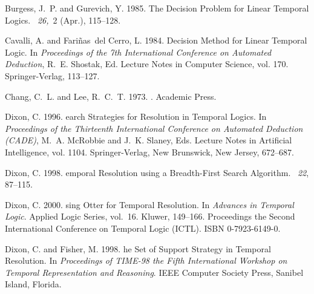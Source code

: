 \documentclass[nohyperref]{acmtrans2f}
\begin{document}
\begin{thebibliography}{}
{\sc Burgess, J.~P.} {\sc and} {\sc Gurevich, Y.} 1985.
\newblock The {D}ecision {P}roblem for {L}inear {T}emporal {L}ogics.
~{\em 26,\/}~2 (Apr.),
  115--128.

{\sc Cavalli, A.} {\sc and} {\sc Fari{\~n}as~del Cerro, L.} 1984.
 {D}ecision {M}ethod for {L}inear {T}emporal {L}ogic.
\newblock In {\em Proceedings of the 7th {I}nternational {C}onference on
  {A}utomated {D}eduction}, {R.~E. Shostak}, Ed. Lecture Notes in Computer
  Science, vol. 170. Springer-Verlag, 113--127.

{\sc Chang, C.~L.} {\sc and} {\sc Lee, R.~C.~T.} 1973.
.
\newblock Academic Press.

{\sc Dixon, C.} 1996.
earch {S}trategies for {R}esolution in {T}emporal {L}ogics.
\newblock In {\em Proceedings of the Thirteenth International Conference on
  Automated Deduction (CADE)}, {M.~A. McRobbie} {and} {J.~K. Slaney}, Eds.
  Lecture Notes in Artificial Intelligence, vol. 1104. Springer-Verlag, New
  Brunswick, New Jersey, 672--687.

{\sc Dixon, C.} 1998.
emporal {R}esolution using a {B}readth-{F}irst {S}earch
  {A}lgorithm.
~{\em 22},
  87--115.

{\sc Dixon, C.} 2000.
sing {O}tter for {T}emporal {R}esolution.
\newblock In {\em Advances in Temporal Logic}. Applied Logic Series, vol.~16.
  Kluwer, 149--166.
\newblock Proceedings the Second International Conference on Temporal Logic
  (ICTL). ISBN 0-7923-6149-0.

{\sc Dixon, C.} {\sc and} {\sc Fisher, M.} 1998.
he {S}et of {S}upport {S}trategy in {T}emporal {R}esolution.
\newblock In {\em Proceedings of TIME-98 the Fifth International Workshop on
  Temporal Representation and Reasoning}. IEEE Computer Society Press, Sanibel
  Island, Florida.


\end{thebibliography}
\end{document}
